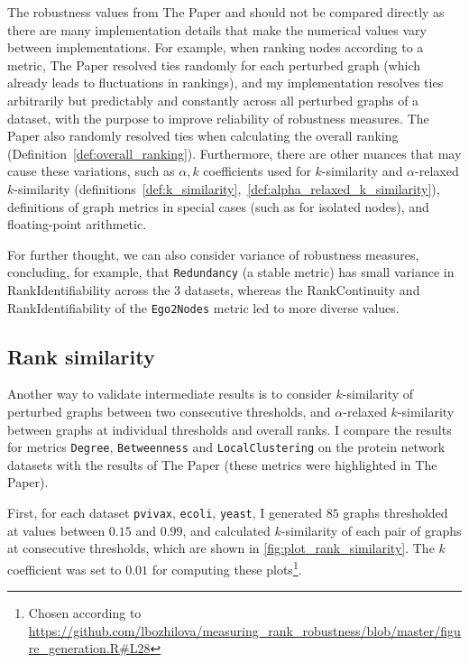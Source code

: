 The robustness values from The Paper and \graffs should not be compared directly as there are many implementation details that make the numerical values vary between implementations.
For example, when ranking nodes according to a metric, The Paper resolved ties randomly for each perturbed graph (which already leads to fluctuations in rankings), and my implementation resolves ties arbitrarily but predictably and constantly across all perturbed graphs of a dataset, with the purpose to improve reliability of robustness measures.
The Paper also randomly resolved ties when calculating the overall ranking (Definition~\ref{def:overall_ranking}).
Furthermore, there are other nuances that may cause these variations, such as $\alpha,k$ coefficients used for $k$-similarity and $\alpha$-relaxed $k$-similarity (definitions~\ref{def:k_similarity},~\ref{def:alpha_relaxed_k_similarity}), definitions of graph metrics in special cases (such as for isolated nodes), and floating-point arithmetic.

For further thought, we can also consider variance of robustness measures, concluding, for example, that \texttt{Redundancy} (a stable metric) has small variance in RankIdentifiability across the 3 datasets, whereas the RankContinuity and RankIdentifiability of the \texttt{Ego2Nodes} metric led to more diverse values.

\subsection{Rank similarity}

Another way to validate intermediate results is to consider $k$-similarity of perturbed graphs between two consecutive thresholds, and $\alpha$-relaxed $k$-similarity between graphs at individual thresholds and overall ranks.
I compare the results for metrics \texttt{Degree}, \texttt{Betweenness} and \texttt{LocalClustering} on the protein network datasets with the results of The Paper (these metrics were highlighted in The Paper).



First, for each dataset \texttt{pvivax}, \texttt{ecoli}, \texttt{yeast}, I generated $85$ graphs thresholded at values between $0.15$ and $0.99$, and calculated $k$-similarity of each pair of graphs at consecutive thresholds, which are shown in \autoref{fig:plot_rank_similarity}.
The $k$ coefficient was set to $0.01$ for computing these plots\footnote{Chosen according to \url{https://github.com/lbozhilova/measuring_rank_robustness/blob/master/figure_generation.R#L28}}.


